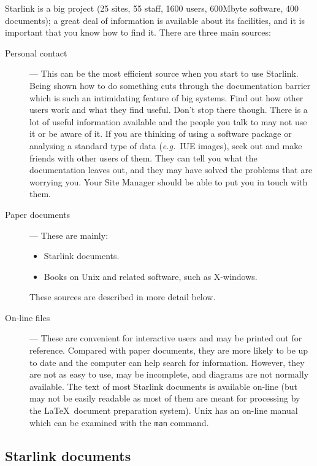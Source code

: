 Starlink is a big project (25 sites, 55 staff, 1600 users, 600Mbyte software,
400 documents); a great deal of information is available about its facilities,
and it is important that you know how to find it.
There are three main sources:
\begin{description}
\item [Personal contact] ---
This can be the most efficient source when you start to use Starlink.
Being shown how to do something cuts through the documentation barrier which is
such an intimidating feature of big systems.
Find out how other users work and what they find useful.
Don't stop there though.
There is a lot of useful information available and the people you talk to may
not use it or be aware of it.
If you are thinking of using a software package or analysing a standard type of
data ({\em e.g.}\, IUE images), seek out and make friends with other users of
them.
They can tell you what the documentation leaves out, and they may have solved
the problems that are worrying you.
Your Site Manager should be able to put you in touch with them.
\item [Paper documents] ---
These are mainly:
\begin{itemize}
\item Starlink documents.
\item Books on Unix and related software, such as X-windows.
\end{itemize}
These sources are described in more detail below.
\item [On-line files] ---
These are convenient for interactive users and may be printed out for reference.
Compared with paper documents, they are more likely to be up to date and the
computer can help search for information.
However, they are not as easy to use, may be incomplete, and diagrams are not
normally available.
The text of most Starlink documents is available on-line (but may not be easily
readable as most of them are meant for processing by the \LaTeX\ document
preparation system).
Unix has an on-line manual which can be examined with the {\tt man} command.
\end{description}

\subsection{Starlink documents}

